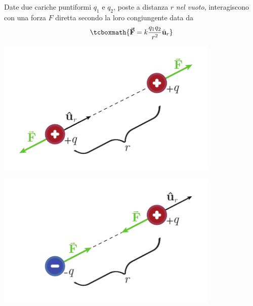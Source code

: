 \begin{define}
	Date due cariche puntiformi $q_1$ e $q_2$, poste a distanza $r$ \textit{nel vuoto}, interagiscono con una forza $F$ diretta secondo la loro congiungente data da
	\begin{equation}
		\tcboxmath{\vba{F}=k\frac{q_1q_2}{r^2}\vbh{u}_r}\label{leggeCoulomb}
	\end{equation}
	\begin{center}
		\begin{minipage}{0.45\textwidth}
			\begin{center}
				\includegraphics[width=0.8\textwidth]{images/chp1forzacoulomb1.pdf}
			\end{center}
		\end{minipage}
		\hspace{5pt}
		\begin{minipage}{0.45\textwidth}
			\begin{center}
				\includegraphics[width=0.8\textwidth]{images/chp1forzacoulomb2.pdf}
			\end{center}
		\end{minipage}
	\end{center}
\end{define}
